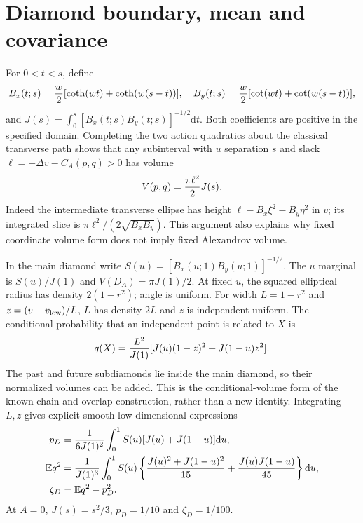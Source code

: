 \documentclass[11pt,a4paper]{article}
\newcommand{\E}{\mathbb E}
\newcommand{\dd}{\mathrm d}
\begin{document}
\section{Diamond boundary, mean and covariance}\label{diamond}
For $0<t<s$, define
\begin{equation}
 B_x(t;s)={w\over2}[\coth(wt)+\coth(w(s-t))],\quad
 B_y(t;s)={w\over2}[\cot(wt)+\cot(w(s-t))], \label{B}
\end{equation}
and $J(s)=\int_0^s[B_x(t;s)B_y(t;s)]^{-1/2}\dd t$.
Both coefficients are positive in the specified domain. Completing the two
action quadratics about the classical transverse path shows that any subinterval
with $u$ separation $s$ and slack $\ell=-\Delta v-C_A(p,q)>0$ has volume
\begin{equation}
 V(p,q)={\pi\ell^2\over2}J(s). \label{intervalvol}
\end{equation}
Indeed the intermediate transverse ellipse has height
$\ell-B_x\xi^2-B_y\eta^2$ in $v$; its integrated slice is
$\pi\ell^2/(2\sqrt{B_xB_y})$. This argument also explains why fixed coordinate
volume form does not imply fixed Alexandrov volume.

In the main diamond write $S(u)=[B_x(u;1)B_y(u;1)]^{-1/2}$.
The $u$ marginal is $S(u)/J(1)$ and $V(D_A)=\pi J(1)/2$.
At fixed $u$, the squared elliptical radius has density $2(1-r^2)$;
angle is uniform. For width $L=1-r^2$ and
$z=(v-v_{\rm low})/L$, $L$ has density $2L$ and $z$ is independent uniform.
The conditional probability that an independent point is related to $X$ is
\begin{equation}
 q(X)={L^2\over J(1)}[J(u)(1-z)^2+J(1-u)z^2]. \label{degree}
\end{equation}
The past and future subdiamonds lie inside the main diamond, so their normalized
volumes can be added. This is the conditional-volume form of the known chain
and overlap construction, rather than a new identity. Integrating $L,z$ gives
explicit smooth low-dimensional expressions
\begin{align}
 p_D&={1\over6J(1)^2}\int_0^1 S(u)[J(u)+J(1-u)]\dd u,\label{pd}\\
 \E q^2&={1\over J(1)^3}\int_0^1 S(u)
 \left\{{J(u)^2+J(1-u)^2\over15}+{J(u)J(1-u)\over45}\right\}\dd u,\label{qd}\\
 \zeta_D&=\E q^2-p_D^2.\nonumber
\end{align}
At $A=0$, $J(s)=s^2/3$, $p_D=1/10$ and $\zeta_D=1/100$.
\end{document}
